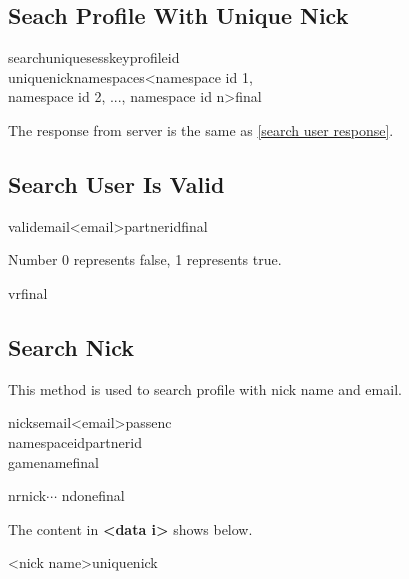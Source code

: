 \documentclass[oneside,titlepage,a4paper]{Definition/retrospy} %
\begin{document}
\subsection{Seach Profile With Unique Nick}
\ClientRequest
\begin{mybox}
	\tbs searchunique\tbs\tbs sesskey\tbs<session key>\tbs profileid\tbs<profile id>\\\tbs uniquenick\tbs<unique nick>\tbs namespaces\tbs<namespace id 1,\\ namespace id 2, ..., namespace id n>\tbs final\tbs
\end{mybox}
\ServerResponse
The response from server is the same as \ref{search user response}.
\subsection{Search User Is Valid}
\ClientRequest

\begin{mybox}
	\tbs valid\tbs\tbs email\tbs<email>\tbs partnerid\tbs<partner id>\tbs final\tbs
\end{mybox}

\ServerResponse

Number 0 represents false, 1 represents true.
\begin{mybox}
	\tbs vr\tbs <valid code: 0 or 1>\tbs final \tbs
\end{mybox}

\subsection{Search Nick}
This method is used to search profile with nick name and email.
\ClientRequest

\begin{mybox}
	\tbs nicks\tbs\tbs email\tbs <email>\tbs passenc\tbs<encrypted password>\\\tbs namespaceid\tbs <namespace id>\tbs partnerid\tbs<partner id>\\\tbs gamename\tbs<game name>\tbs final\tbs
\end{mybox}

\ServerResponse

\begin{mybox}
	\tbs nr\tbs\tbs nick\tbs<data 1>\tbs<data 2>\tbs $\cdots$\tbs <data n> \tbs ndone\tbs final\tbs
\end{mybox}
The content in \textbf{<data i>} shows below.
\begin{mybox}
	 <nick name>\tbs uniquenick \tbs<unique nick>
\end{mybox}
\end{document}
